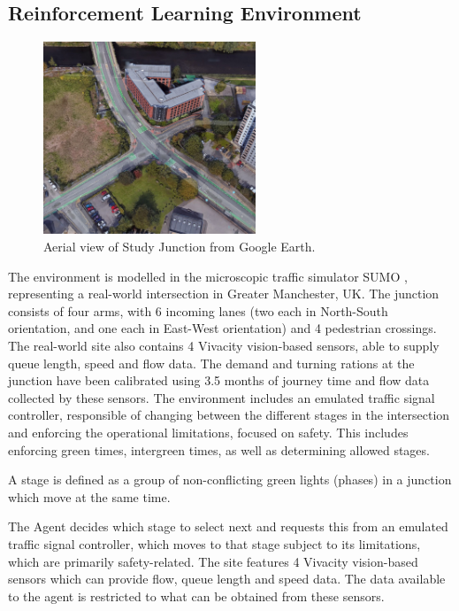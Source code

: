 \documentclass[conference]{IEEEtran}
\begin{document}
\subsection{Reinforcement Learning Environment}
\begin{figure}                                                
\centering                                                    
\includegraphics[width=2.5in]{gmaps_iso_censored.jpg}                                    
\caption{Aerial view of Study Junction from Google Earth.}                                  
\label{intersection}                                               
\end{figure}
The environment is modelled in the microscopic traffic simulator SUMO \cite{sumo}, representing a real-world intersection in Greater Manchester, UK.
The junction consists of four arms, with 6 incoming lanes (two each in North-South orientation, and one each in East-West orientation) and 4 pedestrian crossings.
The real-world site also contains 4 Vivacity vision-based sensors, able to supply queue length, speed and flow data.
The demand and turning rations at the junction have been calibrated using 3.5 months of journey time and flow data collected by these sensors.
The environment includes an emulated traffic signal controller, responsible of changing between the different stages in the intersection and enforcing the operational limitations, focused on safety.
This includes enforcing green times, intergreen times, as well as determining allowed stages.  

A stage is defined as a group of non-conflicting green lights (phases) in a junction which move at the same time.

The Agent decides which stage to select next and requests this from an emulated traffic signal controller, which moves to that stage subject to its limitations, which are primarily safety-related.
The site features 4 Vivacity vision-based sensors which can provide flow, queue length and speed data. The data available to the agent is restricted to what can be obtained from these sensors.     
\end{document}
